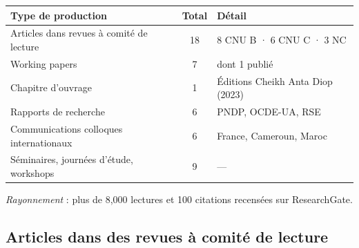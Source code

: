 \documentclass[
  french,
  10pt,
  letterpaper,
  DIV=11,
  numbers=noendperiod]{scrartcl}
\begin{document}
\begin{center}
\small
\begin{tabular}{l c l}
\toprule
\textbf{Type de production} & \textbf{Total} & \textbf{Détail} \\
\midrule
Articles dans revues à comité de lecture & 18 & 8 CNU B · 6 CNU C · 3 NC \\
Working papers & 7 & dont 1 publié \\
Chapitre d'ouvrage & 1 & Éditions Cheikh Anta Diop (2023) \\
Rapports de recherche & 6 & PNDP, OCDE-UA, RSE \\
Communications colloques internationaux & 6 & France, Cameroun, Maroc \\
Séminaires, journées d'étude, workshops & 9 & — \\
\bottomrule
\end{tabular}
\end{center}

\vspace{-2pt}

\noindent\textit{Rayonnement} : plus de 8,000 lectures et 100 citations
recensées sur ResearchGate.

\subsection{Articles dans des revues à comité de
lecture}\label{articles-dans-des-revues-uxe0-comituxe9-de-lecture}
\end{document}
